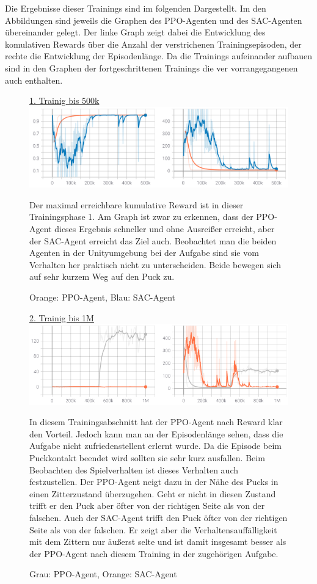 Die Ergebnisse dieser Trainings sind im folgenden Dargestellt. Im den Abbildungen sind jeweils die Graphen des PPO-Agenten und des SAC-Agenten übereinander gelegt. Der linke Graph zeigt dabei die Entwicklung des komulativen Rewards über die Anzahl der verstrichenen Trainingsepisoden, der rechte die Entwicklung der Episodenlänge. Da die Trainings aufeinander aufbauen sind in den Graphen der fortgeschrittenen Trainings die ver vorrangegangenen auch enthalten.\\
\newpage
\begin{figure} [h]
\underline{1. Trainig bis 500k} \\

\includegraphics[width=\textwidth]{images/reaching_erg}
\caption{Orange: PPO-Agent, Blau: SAC-Agent}
Der maximal erreichbare kumulative Reward ist in dieser Trainingsphase 1. Am Graph ist zwar zu erkennen, dass der PPO-Agent dieses Ergebnis schneller und ohne Ausreißer erreicht, aber der SAC-Agent erreicht das Ziel auch. Beobachtet man die beiden Agenten in der Unityumgebung bei der Aufgabe sind sie vom Verhalten her praktisch nicht zu unterscheiden. Beide bewegen sich auf sehr kurzem Weg auf den Puck zu.
\end{figure}

\begin{figure} [h]
\underline{2. Trainig bis 1M} \\
\includegraphics[width=\textwidth]{images/rea2_erg}
\caption{Grau: PPO-Agent, Orange: SAC-Agent}

In diesem Trainingsabschnitt hat der PPO-Agent nach Reward klar den Vorteil. Jedoch kann man an der Episodenlänge sehen, dass die Aufgabe nicht zufriedenstellent erlernt wurde. Da die Episode beim Puckkontakt beendet wird sollten sie sehr kurz ausfallen. Beim Beobachten des Spielverhalten ist dieses Verhalten auch festzustellen. Der PPO-Agent neigt dazu in der Nähe des Pucks in einen Zitterzustand überzugehen. Geht er nicht in diesen Zustand trifft er den Puck aber öfter von der richtigen Seite als von der falschen. Auch der SAC-Agent trifft den Puck öfter von der richtigen Seite als von der falschen. Er zeigt  aber die Verhaltensauffälligkeit mit dem Zittern nur äußerst selte und ist damit insgesamt besser als der PPO-Agent nach diesem Training in der zugehörigen Aufgabe.
\end{figure}

